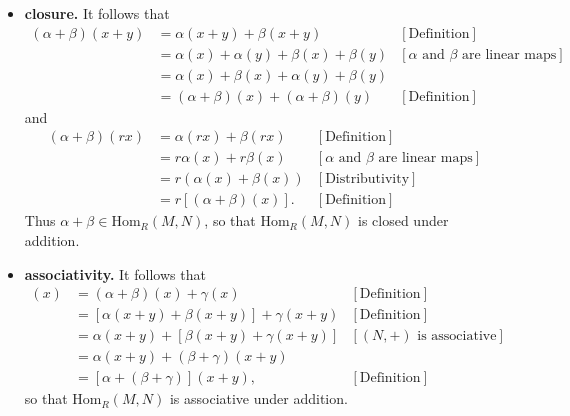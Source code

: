 \documentclass[9pt]{article}
\begin{document}
\begin{enumerate}
      \begin{itemize}
         \item \textbf{closure.} It follows that
               \begin{align*}
                  (\alpha + \beta)(x + y) &= \alpha(x + y) + \beta(x + y)
                     &[\text{Definition}] \\
                     &= \alpha(x) + \alpha(y) + \beta(x) + \beta(y)
                        &[\alpha \text{ and } \beta \text{ are linear maps}] \\
                     &= \alpha(x) + \beta(x) + \alpha(y) + \beta(y) \\
                     &= (\alpha+\beta)(x) + (\alpha+\beta)(y)
                        &[\text{Definition}] 
               \end{align*}
               and
               \begin{align*}
                  (\alpha + \beta)(rx) &= \alpha(rx) + \beta(rx)
                     &[\text{Definition}] \\
                     &= r\alpha(x) + r\beta(x)
                        &[\alpha \text{ and } \beta \text{ are linear maps}] \\
                     &= r(\alpha(x) + \beta(x)) &[\text{Distributivity}] \\
                     &= r[(\alpha+\beta)(x)]. &[\text{Definition}] 
               \end{align*}
               Thus $\alpha+\beta \in \text{Hom}_R(M, N)$, so that
               $\text{Hom}_R(M, N)$ is closed under addition.
         \item \textbf{associativity.} It follows that
               \begin{align*}
                  [(\alpha + \beta) + \gamma](x) &=
                     (\alpha+\beta)(x) + \gamma(x) &[\text{Definition}] \\
                     &= [\alpha(x + y) + \beta(x + y)] + \gamma(x + y)
                        &[\text{Definition}] \\
                     &= \alpha(x + y) + [\beta(x + y) + \gamma(x + y)]
                        &[(N, +) \text{ is associative}] \\
                     &= \alpha(x + y) + (\beta+\gamma)(x + y) \\
                     &= [\alpha + (\beta + \gamma)](x+y), &[\text{Definition}]
               \end{align*}
               so that $\text{Hom}_R(M, N)$ is associative under addition.

\end{itemize}
\end{enumerate}
\end{document}
